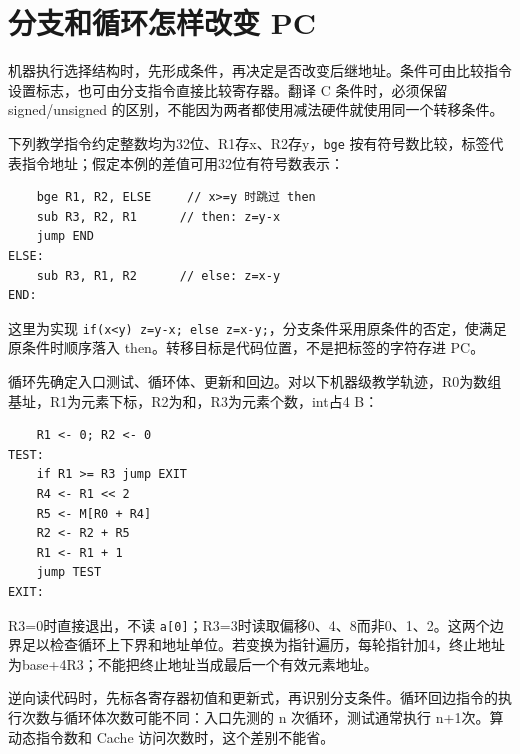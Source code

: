 \section{分支和循环怎样改变 PC}\label{co-04-06}

机器执行选择结构时，先形成条件，再决定是否改变后继地址。条件可由比较指令设置标志，也可由分支指令直接比较寄存器。翻译 C 条件时，必须保留 signed/unsigned 的区别，不能因为两者都使用减法硬件就使用同一个转移条件。

下列教学指令约定整数均为32位、R1存x、R2存y，\texttt{bge} 按有符号数比较，标签代表指令地址；假定本例的差值可用32位有符号数表示：

\par\medskip\noindent
\begin{minipage}{\linewidth}
\begin{verbatim}
    bge R1, R2, ELSE     // x>=y 时跳过 then
    sub R3, R2, R1      // then: z=y-x
    jump END
ELSE:
    sub R3, R1, R2      // else: z=x-y
END:
\end{verbatim}
\end{minipage}\par\medskip

这里为实现 \texttt{if(x\textless{}y)\ z=y-x;}\allowbreak{}\texttt{\ else\ z=x-y;}\allowbreak{}，分支条件采用原条件的否定，使满足原条件时顺序落入 then。转移目标是代码位置，不是把标签的字符存进 PC。

循环先确定入口测试、循环体、更新和回边。对以下机器级教学轨迹，R0为数组基址，R1为元素下标，R2为和，R3为元素个数，int占4 B：

\par\medskip\noindent
\begin{minipage}{\linewidth}
\begin{verbatim}
    R1 <- 0; R2 <- 0
TEST:
    if R1 >= R3 jump EXIT
    R4 <- R1 << 2
    R5 <- M[R0 + R4]
    R2 <- R2 + R5
    R1 <- R1 + 1
    jump TEST
EXIT:
\end{verbatim}
\end{minipage}\par\medskip

R3=0时直接退出，不读 \texttt{a{[}0{]}}；R3=3时读取偏移0、4、8而非0、1、2。这两个边界足以检查循环上下界和地址单位。若变换为指针遍历，每轮指针加4，终止地址为base+4R3；不能把终止地址当成最后一个有效元素地址。

逆向读代码时，先标各寄存器初值和更新式，再识别分支条件。循环回边指令的执行次数与循环体次数可能不同：入口先测的 n 次循环，测试通常执行 n+1次。算动态指令数和 Cache 访问次数时，这个差别不能省。

